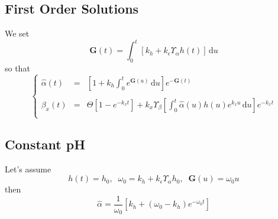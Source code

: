 \documentclass[aps,onecolumn,12pt]{revtex4}
\newcommand{\ig}{\ensuremath{\mathbf{G}}}
\begin{document}
\subsection{First Order Solutions}
We set
\begin{equation}
	\ig(t) = \int_0^{t} \left[ k_h + k_\epsilon \Upsilon_\alpha h(t) \right] \,\mathrm{d}u
\end{equation}
so that
\begin{equation}
\left\lbrace
\begin{array}{rcl}
	\hat\alpha(t) & = & \displaystyle \left[1+ k_h\int_0^t e^{\ig(u)}\,\mathrm{d} u\right] e^{-\ig(t)} \\
	\\
	\beta_x(t)    & = & \displaystyle \Theta \left[ 1-e^{-k_x t} \right] + k_x \Upsilon_\beta \left[ \int_0^t  \hat\alpha(u) h(u) e^{k_x u} \,\mathrm{d} u\right] e^{-k_xt}\\
\end{array}
\right.
\end{equation}

\subsection{Constant pH}
Let's assume
\begin{equation}
	h(t) = h_0, \;\;\omega_0 = k_h + k_\epsilon \Upsilon_\alpha h_0,\;\; \ig(u) = \omega_0 u
\end{equation}
then
\begin{equation}
	\hat\alpha = \dfrac{1}{\omega_0} \left[ k_h + \left(\omega_0-k_h\right)e^{-\omega_0 t}\right]
\end{equation}
\end{document}
